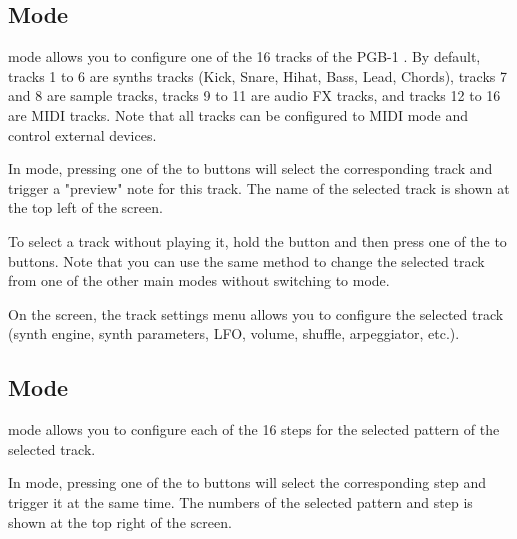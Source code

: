 \documentclass[8pt]{extarticle}
\def\device{PGB-1 }
\newcommand{\OLEDscreenshot}[1]{
\begin{tcolorbox}[hbox, colframe=black, colback=white, boxsep=-3pt]%
\texttt{[image: \#1]}
\end{tcolorbox}
}
\begin{document}
\begin{multicols*}{3}
\subsection{ Mode}

 mode allows you to configure one of the 16 tracks of the \device. By default, tracks 1 to 6 are synths tracks (Kick, Snare, Hihat, Bass, Lead, Chords), tracks 7 and 8 are sample tracks, tracks 9 to 11 are audio FX tracks, and tracks 12 to 16 are MIDI tracks. Note that all tracks can be configured to MIDI mode and control external devices.

In  mode, pressing one of the  to  buttons will select the corresponding track and trigger a "preview" note for this track. The name of the selected track is shown at the top left of the screen.

\begin{center}
    \scalebox{0.7}{
    \begin{tikzpicture}
        [spy using outlines={circle, magnification=3, connect spies},
        image/.style = {scale=0.6,},
        ]

        \node[image] (A) {\OLEDscreenshot{../assets/OLED-screenshots/PGB1-OLED-track-LFO.png}};

        \spy [black, size=2cm] on (-1.10,0.6) in node [left] at (-2.1,0.0);
    \end{tikzpicture}
    }
\end{center}

To select a track without playing it, hold the  button and then press one of the  to  buttons. Note that you can use the same method to change the selected track from one of the other main modes without switching to  mode.

On the screen, the track settings menu allows you to configure the selected track (synth engine, synth parameters, LFO, volume, shuffle, arpeggiator, etc.).

\subsection{ Mode}

 mode allows you to configure each of the 16 steps for the selected pattern of the selected track.

In  mode, pressing one of the  to  buttons will select the corresponding step and trigger it at the same time. The numbers of the selected pattern and step is shown at the top right of the screen.


\end{multicols*}
\end{document}
